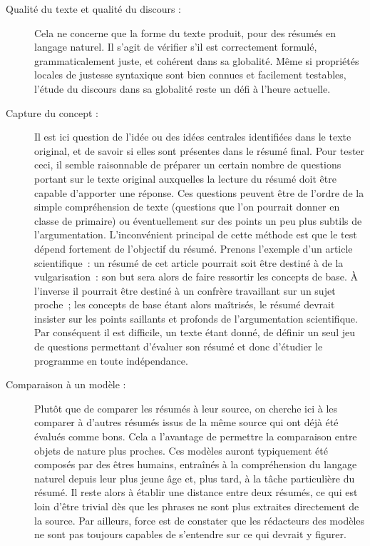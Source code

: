 \documentclass[a4paper, 12pt]{article}
\begin{document}
\begin{description}
  \item [Qualité du texte et qualité du discours :] Cela ne concerne que la forme du texte produit, pour des résumés en langage naturel. Il s'agit de vérifier s'il est correctement formulé, grammaticalement juste, et cohérent dans sa globalité. Même si propriétés locales de justesse syntaxique sont bien connues et facilement testables, l'étude du discours dans sa globalité reste un défi à l'heure actuelle.
  \item [Capture du concept :] Il est ici question de l'idée ou des idées centrales identifiées dans le texte original, et de savoir si elles sont présentes dans le résumé final. Pour tester ceci, il semble raisonnable de préparer un certain nombre de questions portant sur le texte original auxquelles la lecture du résumé doit être capable d'apporter une réponse. Ces questions peuvent être de l'ordre de la simple compréhension de texte (questions que l'on pourrait donner en classe de primaire) ou éventuellement sur des points un peu plus subtils de l'argumentation. L'inconvénient principal de cette méthode est que le test dépend fortement de l'objectif du résumé. Prenons l'exemple d'un article scientifique~: un résumé de cet article pourrait soit être destiné à de la vulgarisation~: son but sera alors de faire ressortir les concepts de base. À l'inverse il pourrait être destiné à un confrère travaillant sur un sujet proche~; les concepts de base étant alors maîtrisés, le résumé devrait insister sur les points saillants et profonds de l'argumentation scientifique. Par conséquent il est difficile, un texte étant donné, de définir un seul jeu de questions permettant d'évaluer son résumé et donc d'étudier le programme en toute indépendance.
  \item [Comparaison à un modèle :] Plutôt que de comparer les résumés à leur source, on cherche ici à les comparer à d'autres résumés issus de la même source qui ont déjà été évalués comme bons. Cela a l'avantage de permettre la comparaison entre objets de nature plus proches. Ces modèles auront typiquement été composés par des êtres humains, entraînés à la compréhension du langage naturel depuis leur plus jeune âge et, plus tard, à la tâche particulière du résumé. Il reste alors à établir une distance entre deux résumés, ce qui est loin d'être trivial dès que les phrases ne sont plus extraites directement de la source. Par ailleurs, force est de constater que les rédacteurs des modèles ne sont pas toujours capables de s'entendre sur ce qui devrait y figurer.
 \end{description}
\end{document}
